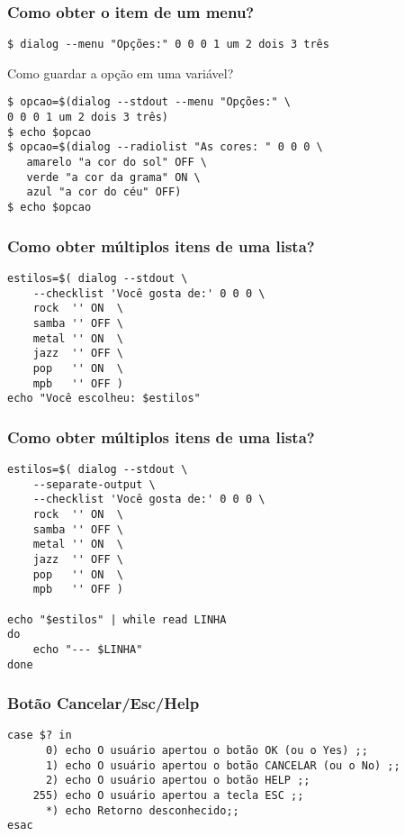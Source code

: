 \documentclass{beamer}
\begin{document}
   \begin{frame}[fragile]
      \frametitle{Como obter o item de um menu?}
      \begin{verbatim}
$ dialog --menu "Opções:" 0 0 0 1 um 2 dois 3 três
      \end{verbatim}
      Como guardar a opção em uma variável? \\
      \begin{verbatim}
$ opcao=$(dialog --stdout --menu "Opções:" \ 
0 0 0 1 um 2 dois 3 três)
$ echo $opcao
$ opcao=$(dialog --radiolist "As cores: " 0 0 0 \
   amarelo "a cor do sol" OFF \
   verde "a cor da grama" ON \
   azul "a cor do céu" OFF)
$ echo $opcao
      \end{verbatim}
\end{frame}

   \begin{frame}[fragile]
      \frametitle{Como obter múltiplos itens de uma lista?}
      \begin{verbatim}
estilos=$( dialog --stdout \
	--checklist 'Você gosta de:' 0 0 0 \
	rock  '' ON  \
	samba '' OFF \
	metal '' ON  \
	jazz  '' OFF \
	pop   '' ON  \
	mpb   '' OFF )
echo "Você escolheu: $estilos"      
      \end{verbatim}
\end{frame}

   \begin{frame}[fragile]
      \frametitle{Como obter múltiplos itens de uma lista?}
      \begin{verbatim}
estilos=$( dialog --stdout \
	--separate-output \
	--checklist 'Você gosta de:' 0 0 0 \
	rock  '' ON  \
	samba '' OFF \
	metal '' ON  \
	jazz  '' OFF \
	pop   '' ON  \
	mpb   '' OFF )

echo "$estilos" | while read LINHA
do
 	echo "--- $LINHA"
done      
      \end{verbatim}
\end{frame}

   \begin{frame}[fragile]
      \frametitle{Botão Cancelar/Esc/Help}
      \footnotesize
      \begin{verbatim}
case $? in
	  0) echo O usuário apertou o botão OK (ou o Yes) ;;
	  1) echo O usuário apertou o botão CANCELAR (ou o No) ;;
	  2) echo O usuário apertou o botão HELP ;;
	255) echo O usuário apertou a tecla ESC ;;
	  *) echo Retorno desconhecido;;
esac
      \end{verbatim}
\end{frame}
\end{document}

